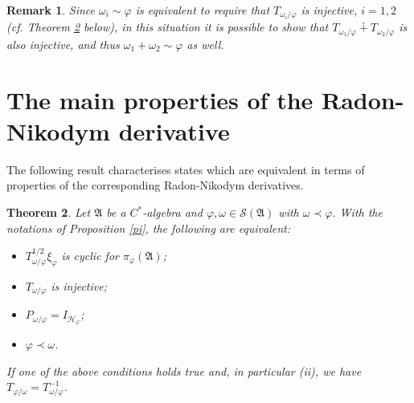 \documentclass[12pt]{amsart}
\numberwithin{equation}{section}
\def\cs{{\mathcal S}}
\def\ga{{\mathfrak A}} \def\gpa{{\mathfrak a}}
\def\f{\varphi}\def\ff{\phi} \def\F{\Phi}
\def\om{\omega} \def\Om{\Omega}
\newtheorem{thm}{Theorem}[section]
\newtheorem{rem}[thm]{Remark}
\begin{document}
\begin{rem}
Since $\om_i\sim\f$ is equivalent to require that $T_{\om_i/\f}$ is injective, $i=1,2$ (cf. Theorem \ref{invinv} below), in this situation it is possible to show that $T_{\om_1/\f}\dotplus T_{\om_2/\f}$ is also injective, and thus $\om_1+\om_2\sim\f$ as well.
\end{rem}





\section{The main properties of the Radon-Nikodym derivative}
\label{secmain1}

The following result characterises states which are equivalent in terms of properties of the corresponding Radon-Nikodym derivatives.
\begin{thm}
\label{invinv}
Let $\ga$ be a $C^*$-algebra and $\f,\om\in\cs(\ga)$ with $\om\prec\f$. 
With the notations of Proposition \ref{pi}, the following are equivalent:
\begin{itemize}
\item[(i)] $T_{\om/\f}^{1/2}\xi_\f$ is cyclic for $\pi_\f(\ga)$;
\item[(ii)] $T_{\om/\f}$ is injective;
\item[(iii)] $P_{\om/\f}=I_{\mathcal H_\varphi}$;
\item[(iv)]  $\f\prec\om$.
\end{itemize}
If one of the above conditions holds true and, in particular (ii),
we have $T_{\f/\om}=T_{\om/\f}^{-1}$.
\end{thm}
\end{document}
